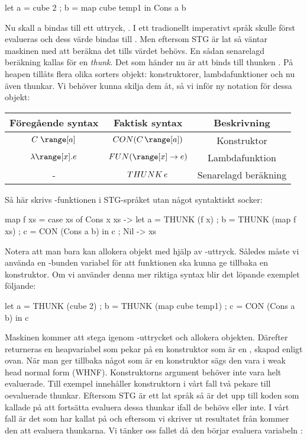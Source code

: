 \documentclass[../Core]{subfiles}
\begin{document}
\begin{codeEx}
let { a = cube 2
    ; b = map cube temp1
    } in Cons a b
\end{codeEx}

Nu skall a bindas till ett uttryck, . I ett tradionellt imperativt språk skulle
 först evalueras och dess värde bindas till . Men eftersom STG
är lat så väntar maskinen med att beräkna det tills värdet behövs.
En sådan senarelagd beräkning kallas för en \emph{thunk}. Det som händer nu är att
 binds till thunken . På heapen tillåts flera olika
sorters objekt: konstruktorer, lambdafunktioner och nu även thunkar.
Vi behöver kunna skilja dem åt, så vi inför ny notation för dessa objekt:

\begin{tabular}{ccc}
Föregående syntax & Faktisk syntax & Beskrivning\tabularnewline
\hline
$C\;\range[a]$ & $\CON C{\range[a]}$ & Konstruktor\tabularnewline
$\lambda\range[x].e$ & $\FUN{\range[x]}e$ & Lambdafunktion\tabularnewline
- & $THUNK\,e$ & Senarelagd beräkning\tabularnewline
\end{tabular}

Så här skrivs -funktionen i STG-språket utan något syntaktiskt socker:

\begin{codeEx}
map f xs = case xs of
    { Cons x xs -> let { a = THUNK (f x)
                       ; b = THUNK (map f xs)
                       ; c = CON (Cons a b)
                       } in c
    ; Nil       -> xs
    }
\end{codeEx}

Notera att man bara kan allokera objekt med hjälp av -uttryck. Således
måste vi använda en -bunden variabel  för att funktionen ska kunna ge tillbaka en konstruktor.
Om vi använder denna mer riktiga syntax blir det löpande exemplet följande:

\begin{codeEx}
let { a = THUNK (cube 2)
    ; b = THUNK (map cube temp1)
    ; c = CON (Cons a b)
    } in c
\end{codeEx}

Maskinen kommer att stega igenom -uttrycket och allokera objekten.
Därefter returneras en heapvariabel som pekar på en konstruktor
som är en , skapad enligt ovan. När man ger tillbaka något som är
en konstruktor sägs den vara i weak head normal form (WHNF). Konstruktorns
argument behöver inte vara helt evaluerade. Till exempel innehåller konstruktorn i vårt fall
två pekare till oevaluerade thunkar. Eftersom STG är ett
lat språk så är det upp till koden som kallade på  att fortsätta
evaluera dessa thunkar ifall de behövs eller inte. I vårt fall är
det  som har kallat på  och eftersom vi skriver ut resultatet från 
kommer den att evaluera thunkarna. Vi tänker oss fallet då den börjar evaluera variabeln :
\end{document}
